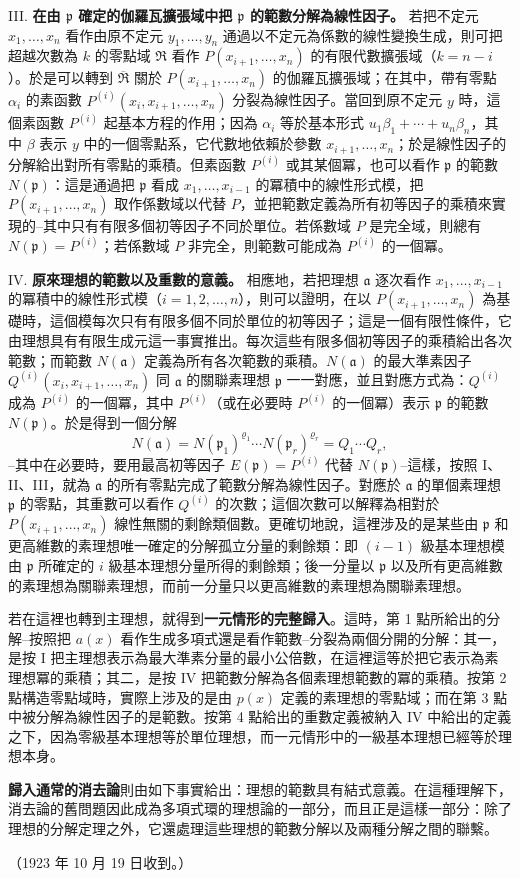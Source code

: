 \documentclass[11pt]{article}
\newcommand{\frakR}{\mathfrak R}
\newcommand{\fraka}{\mathfrak a}
\newcommand{\frakp}{\mathfrak p}
\newcommand{\srcemph}[1]{\textbf{#1}}
\begin{document}
\noindent III. \srcemph{在由 $\frakp$ 確定的伽羅瓦擴張域中把 $\frakp$ 的範數分解為線性因子。} 若把不定元 $x_1,\ldots,x_n$ 看作由原不定元 $y_1,\ldots,y_n$ 通過以不定元為係數的線性變換生成，則可把超越次數為 $k$ 的零點域 $\frakR$ 看作 $P(x_{i+1},\ldots,x_n)$ 的有限代數擴張域（$k=n-i$）。於是可以轉到 $\overline{\frakR}$ 關於 $P(x_{i+1},\ldots,x_n)$ 的伽羅瓦擴張域；在其中，帶有零點 $\alpha_i$ 的素函數 $P^{(i)}(x_i,x_{i+1},\ldots,x_n)$ 分裂為線性因子。當回到原不定元 $y$ 時，這個素函數 $P^{(i)}$ 起基本方程的作用；因為 $\alpha_i$ 等於基本形式 $u_1\beta_1+\cdots+u_n\beta_n$，其中 $\beta$ 表示 $y$ 中的一個零點系，它代數地依賴於參數 $x_{i+1},\ldots,x_n$；於是線性因子的分解給出對所有零點的乘積。但素函數 $P^{(i)}$ 或其某個冪，也可以看作 $\frakp$ 的範數 $N(\frakp)$：這是通過把 $\frakp$ 看成 $x_1,\ldots,x_{i-1}$ 的冪積中的線性形式模，把 $P(x_{i+1},\ldots,x_n)$ 取作係數域以代替 $P$，並把範數定義為所有初等因子的乘積來實現的--其中只有有限多個初等因子不同於單位。若係數域 $P$ 是完全域，則總有 $N(\frakp)=P^{(i)}$；若係數域 $P$ 非完全，則範數可能成為 $P^{(i)}$ 的一個冪。

\noindent IV. \srcemph{原來理想的範數以及重數的意義。} 相應地，若把理想 $\fraka$ 逐次看作 $x_1,\ldots,x_{i-1}$ 的冪積中的線性形式模（$i=1,2,\ldots,n$），則可以證明，在以 $P(x_{i+1},\ldots,x_n)$ 為基礎時，這個模每次只有有限多個不同於單位的初等因子；這是一個有限性條件，它由理想具有有限生成元這一事實推出。每次這些有限多個初等因子的乘積給出各次範數；而範數 $N(\fraka)$ 定義為所有各次範數的乘積。$N(\fraka)$ 的最大準素因子 $Q^{(i)}(x_i,x_{i+1},\ldots,x_n)$ 同 $\fraka$ 的關聯素理想 $\frakp$ 一一對應，並且對應方式為：$Q^{(i)}$ 成為 $P^{(i)}$ 的一個冪，其中 $P^{(i)}$（或在必要時 $P^{(i)}$ 的一個冪）表示 $\frakp$ 的範數 $N(\frakp)$。於是得到一個分解
\[
 N(\fraka)=N(\frakp_1)^{\varrho_1}\cdots N(\frakp_r)^{\varrho_r}=Q_1\cdots Q_r,
\]
--其中在必要時，要用最高初等因子 $E(\frakp)=P^{(i)}$ 代替 $N(\frakp)$--這樣，按照 I、II、III，就為 $\fraka$ 的所有零點完成了範數分解為線性因子。對應於 $\fraka$ 的單個素理想 $\frakp$ 的零點，其重數可以看作 $Q^{(i)}$ 的次數；這個次數可以解釋為相對於 $P(x_{i+1},\ldots,x_n)$ 線性無關的剩餘類個數。更確切地說，這裡涉及的是某些由 $\frakp$ 和更高維數的素理想唯一確定的分解孤立分量的剩餘類：即 $(i-1)$ 級基本理想模由 $\frakp$ 所確定的 $i$ 級基本理想分量所得的剩餘類；後一分量以 $\frakp$ 以及所有更高維數的素理想為關聯素理想，而前一分量只以更高維數的素理想為關聯素理想。

若在這裡也轉到主理想，就得到\srcemph{一元情形的完整歸入}。這時，第 1 點所給出的分解--按照把 $a(x)$ 看作生成多項式還是看作範數--分裂為兩個分開的分解：其一，是按 I 把主理想表示為最大準素分量的最小公倍數，在這裡這等於把它表示為素理想冪的乘積；其二，是按 IV 把範數分解為各個素理想範數的冪的乘積。按第 2 點構造零點域時，實際上涉及的是由 $p(x)$ 定義的素理想的零點域；而在第 3 點中被分解為線性因子的是範數。按第 4 點給出的重數定義被納入 IV 中給出的定義之下，因為零級基本理想等於單位理想，而一元情形中的一級基本理想已經等於理想本身。

\srcemph{歸入通常的消去論}則由如下事實給出：理想的範數具有結式意義。在這種理解下，消去論的舊問題因此成為多項式環的理想論的一部分，而且正是這樣一部分：除了理想的分解定理之外，它還處理這些理想的範數分解以及兩種分解之間的聯繫。

\begin{center}
（1923 年 10 月 19 日收到。）
\end{center}
\end{document}
